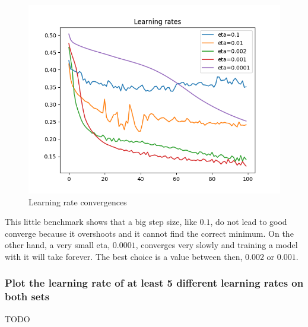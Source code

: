 \documentclass[11pt]{article}
\begin{document}
\begin{figure}[H]
\centering
\label{fig: learning_rate_convergence}
\includegraphics[scale=0.6]{images/NN_eta_vs_training}
\caption{Learning rate convergences}
\end{figure}

This little benchmark shows that a big step size, like $0.1$, do not lead to good converge because it overshoots and it cannot find the correct minimum. On the other hand, a very small eta, $0.0001$, converges very slowly and training a model with it will take forever. The best choice is a value between then, $0.002$ or $0.001$.
\subsubsection{Plot the learning rate of at least 5 different learning rates on both sets}
TODO
\end{document}

